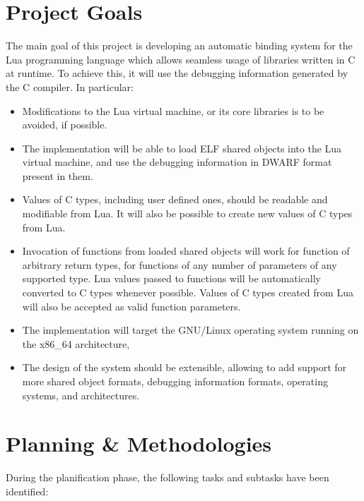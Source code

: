 \section{Project Goals}

The main goal of this project is developing an automatic binding system for
the Lua programming language which allows seamless usage of libraries written
in C at runtime. To achieve this, it will use the debugging information
generated by the C compiler. In particular:

\begin{itemize}
	\item Modifications to the Lua virtual machine, or its core libraries is
		to be avoided, if possible.
	\item The implementation will be able to load \gls{ELF} shared objects
		into the Lua virtual machine, and use the debugging information in
		\gls{DWARF} format present in them.
	\item Values of C types, including user defined ones, should be readable
		and modifiable from Lua. It will also be possible to create new
		values of C types from Lua.
	\item Invocation of functions from loaded shared objects will work for
		function of arbitrary return types, for functions of any number of
		parameters of any supported type. Lua values passed to functions
		will be automatically converted to C types whenever possible. Values
		of C types created from Lua will also be accepted as valid function
		parameters.
	\item The implementation will target the GNU/Linux operating system
		running on the x86\_64 architecture,
	\item The design of the system should be extensible, allowing to add
		support for more shared object formats, debugging information formats,
		operating systems, and architectures.
\end{itemize}


\section{Planning \& Methodologies}

During the planification phase, the following tasks and subtasks have been
identified:

